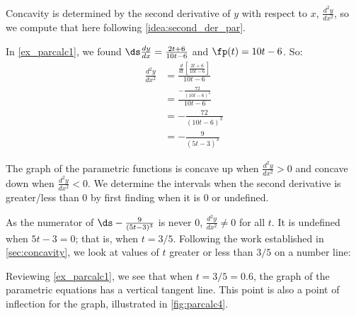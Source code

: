 {Concavity is determined by the second derivative of $y$ with respect to $x$, $\frac{d^2y}{dx^2}$, so we compute that here following \autoref{idea:second_der_par}.

In \autoref{ex_parcalc1}, we found $\ds\frac{dy}{dx} = \frac{2t+6}{10t-6}$ and $\fp(t) = 10t-6$. So:
\begin{align*}
	\frac{d^2y}{dx^2}
	&= \frac{\frac{d}{dt}\left[\frac{2t+6}{10t-6}\right]}{10t-6} \\
	&= \frac{-\frac{72}{(10t-6)^2}}{10t-6}\\
	&= -\frac{72}{(10t-6)^3} \\&= -\frac{9}{(5t-3)^3}
\end{align*}


The graph of the parametric functions is concave up when $\frac{d^2y}{dx^2} > 0$ and concave down when $\frac{d^2y}{dx^2} <0$. We determine the intervals when the second derivative is greater/less than 0 by first finding when it is 0 or undefined.

As the numerator of $\ds -\frac{9}{(5t-3)^3}$ is never 0, $\frac{d^2y}{dx^2} \neq 0$ for all $t$. It is undefined when $5t-3=0$; that is, when $t= 3/5$. Following the work established in \autoref{sec:concavity}, we look at values of $t$ greater or less than $3/5$ on a number line:
\begin{center}
\end{center}

Reviewing \autoref{ex_parcalc1}, we see that when $t=3/5=0.6$, the graph of the parametric equations has a vertical tangent line. This point is also a point of inflection for the graph, illustrated in \autoref{fig:parcalc4}.}


